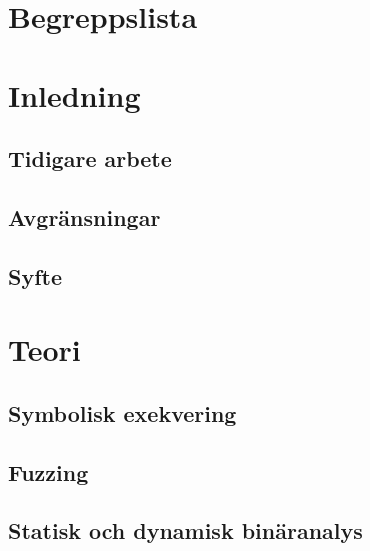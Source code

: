 \documentclass[12pt, a4paper]{report}
\begin{document}


\newpage\null %
\newpage


\newpage
{} %
\setcounter{page}{3}

\tableofcontents
\newpage

\chapter*{Begreppslista}


\newpage


\chapter{Inledning}

\section{Tidigare arbete}

\section{Avgränsningar}

\section{Syfte}


\chapter{Teori}

\section{Symbolisk exekvering}\label{symbolisk_exekvering}

\section{Fuzzing}

\section{Statisk och dynamisk binäranalys}

\end{document}
